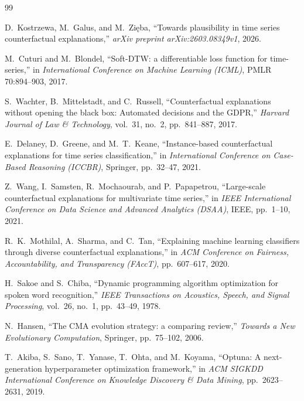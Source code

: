 \documentclass[11pt,a4paper]{report}
\begin{document}
\begin{thebibliography}{99}

D.~Kostrzewa, M.~Galus, and M.~Zięba, ``Towards plausibility in time series counterfactual explanations,'' \emph{arXiv preprint arXiv:2603.08349v1}, 2026.

M.~Cuturi and M.~Blondel, ``Soft-DTW: a differentiable loss function for time-series,'' in \emph{International Conference on Machine Learning (ICML)}, PMLR 70:894--903, 2017.

S.~Wachter, B.~Mittelstadt, and C.~Russell, ``Counterfactual explanations without opening the black box: Automated decisions and the GDPR,'' \emph{Harvard Journal of Law \& Technology}, vol.~31, no.~2, pp.~841--887, 2017.

E.~Delaney, D.~Greene, and M.~T.~Keane, ``Instance-based counterfactual explanations for time series classification,'' in \emph{International Conference on Case-Based Reasoning (ICCBR)}, Springer, pp.~32--47, 2021.

Z.~Wang, I.~Samsten, R.~Mochaourab, and P.~Papapetrou, ``Large-scale counterfactual explanations for multivariate time series,'' in \emph{IEEE International Conference on Data Science and Advanced Analytics (DSAA)}, IEEE, pp.~1--10, 2021.

R.~K.~Mothilal, A.~Sharma, and C.~Tan, ``Explaining machine learning classifiers through diverse counterfactual explanations,'' in \emph{ACM Conference on Fairness, Accountability, and Transparency (FAccT)}, pp.~607--617, 2020.

H.~Sakoe and S.~Chiba, ``Dynamic programming algorithm optimization for spoken word recognition,'' \emph{IEEE Transactions on Acoustics, Speech, and Signal Processing}, vol.~26, no.~1, pp.~43--49, 1978.

N.~Hansen, ``The CMA evolution strategy: a comparing review,'' \emph{Towards a New Evolutionary Computation}, Springer, pp.~75--102, 2006.

T.~Akiba, S.~Sano, T.~Yanase, T.~Ohta, and M.~Koyama, ``Optuna: A next-generation hyperparameter optimization framework,'' in \emph{ACM SIGKDD International Conference on Knowledge Discovery \& Data Mining}, pp.~2623--2631, 2019.


\end{thebibliography}
\end{document}
